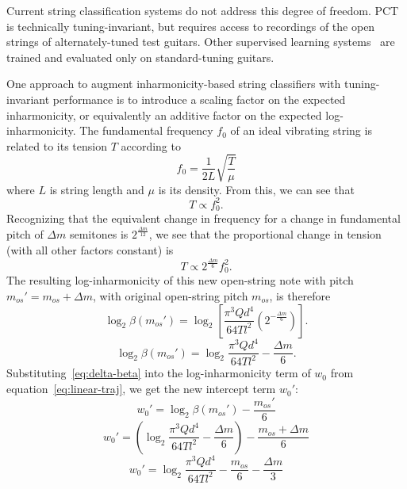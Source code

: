 \documentclass[convention,peer-reviewed]{aesconf}
\begin{document}
Current string classification systems do not address this degree of freedom. PCT~\cite{barbanchoi2012} is technically tuning-invariant, but requires access to recordings of the open strings of alternately-tuned test guitars. Other supervised learning systems~\cite{kehling2014, dittmar2013, abesser2012} are trained and evaluated only on standard-tuning guitars.

One approach to augment inharmonicity-based string classifiers with tuning-invariant performance is to introduce a scaling factor on the expected inharmonicity, or equivalently an additive factor on the expected log-inharmonicity. The fundamental frequency $f_0$ of an ideal vibrating string is related to its tension $T$ according to
\begin{equation}
f_0 = \frac{1}{2L}\sqrt{\frac{T}{\mu}}
\label{eq:freq-tension}
\end{equation}
where $L$ is string length and $\mu$ is its density. From this, we can see that
\begin{equation}
T \propto f_0^{2}.
\end{equation}
Recognizing that the equivalent change in frequency for a change in fundamental pitch of $\Delta m$ semitones is $2^{\frac{\Delta m}{12}}$, we see that the proportional change in tension (with all other factors constant) is
\begin{equation}
T \propto 2^{\frac{\Delta m}{6}}f_0^2.
\end{equation}
The resulting log-inharmonicity of this new open-string note with pitch $m_{os}' = m_{os}+\Delta m$, with original open-string pitch $m_{os}$, is therefore
\begin{equation}
\log_2\beta(m_{os}') = \log_2[ \frac{\pi^3 Q d^4}{64 T l^2}(2^{-\frac{\Delta m}{6}})].
\end{equation}
\begin{equation}
\label{eq:delta-beta}
\log_2\beta(m_{os}') = \log_2\frac{\pi^3 Q d^4}{64 T l^2} - \frac{\Delta m}{6}.
\end{equation}
Substituting~\eqref{eq:delta-beta} into the log-inharmonicity term of $w_0$ from equation~\eqref{eq:linear-traj}, we get the new intercept term $w_0':$
\begin{equation}
w_{0}' = \log_2{\beta}(m_{os}') - \frac{m_{os}'}{6}
\end{equation}
\begin{equation}
w_{0}' = (\log_2\frac{\pi^3 Q d^4}{64 T l^2} - \frac{\Delta m}{6}) - \frac{m_{os}+\Delta m}{6}
\end{equation}
\begin{equation}
\label{eq:3.17}
w_{0}' = \log_2\frac{\pi^3 Q d^4}{64 T l^2} - \frac{m_{os}}{6} - \frac{\Delta m}{3}
\end{equation}
\end{document}
